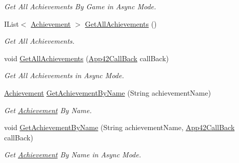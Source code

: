 \begin{DoxyCompactItemize}
\begin{DoxyCompactList}\small\item\em Get All Achievements By Game in Async Mode. \end{DoxyCompactList}\item 
I\+List$<$ \hyperlink{classcom_1_1shephertz_1_1app42_1_1paas_1_1sdk_1_1csharp_1_1achievement_1_1_achievement}{Achievement} $>$ \hyperlink{classcom_1_1shephertz_1_1app42_1_1paas_1_1sdk_1_1csharp_1_1achievement_1_1_achievement_service_a0dbd229c18b5ed8241e48dbd02b911cf}{Get\+All\+Achievements} ()
\begin{DoxyCompactList}\small\item\em Get All Achievements. \end{DoxyCompactList}\item 
void \hyperlink{classcom_1_1shephertz_1_1app42_1_1paas_1_1sdk_1_1csharp_1_1achievement_1_1_achievement_service_ab77cfd321bac1e3b3f21d19ed51ad0a7}{Get\+All\+Achievements} (\hyperlink{interfacecom_1_1shephertz_1_1app42_1_1paas_1_1sdk_1_1csharp_1_1_app42_call_back}{App42\+Call\+Back} call\+Back)
\begin{DoxyCompactList}\small\item\em Get All Achievements in Async Mode. \end{DoxyCompactList}\item 
\hyperlink{classcom_1_1shephertz_1_1app42_1_1paas_1_1sdk_1_1csharp_1_1achievement_1_1_achievement}{Achievement} \hyperlink{classcom_1_1shephertz_1_1app42_1_1paas_1_1sdk_1_1csharp_1_1achievement_1_1_achievement_service_a8a7f41df5220c9d40fe334a9a2509137}{Get\+Achievement\+By\+Name} (String achievement\+Name)
\begin{DoxyCompactList}\small\item\em Get \hyperlink{classcom_1_1shephertz_1_1app42_1_1paas_1_1sdk_1_1csharp_1_1achievement_1_1_achievement}{Achievement} By Name. \end{DoxyCompactList}\item 
void \hyperlink{classcom_1_1shephertz_1_1app42_1_1paas_1_1sdk_1_1csharp_1_1achievement_1_1_achievement_service_a3503c8266de3aeca78869343a4ad828a}{Get\+Achievement\+By\+Name} (String achievement\+Name, \hyperlink{interfacecom_1_1shephertz_1_1app42_1_1paas_1_1sdk_1_1csharp_1_1_app42_call_back}{App42\+Call\+Back} call\+Back)
\begin{DoxyCompactList}\small\item\em Get \hyperlink{classcom_1_1shephertz_1_1app42_1_1paas_1_1sdk_1_1csharp_1_1achievement_1_1_achievement}{Achievement} By Name in Async Mode. \end{DoxyCompactList}\item 

\end{DoxyCompactItemize}
